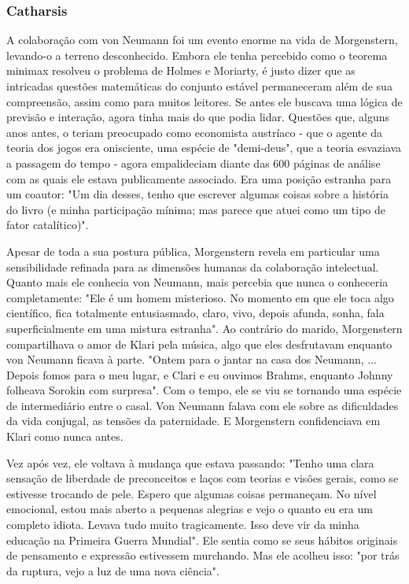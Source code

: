 \documentclass[12pt]{article}
\begin{document}
\subsubsection{\textbf{Catharsis}}
A colaboração com von Neumann foi um evento enorme na vida de Morgenstern, levando-o a terreno desconhecido. Embora ele tenha percebido como o teorema minimax resolveu o problema de Holmes e Moriarty, é justo dizer que as intricadas questões matemáticas do conjunto estável permaneceram além de sua compreensão, assim como para muitos leitores. Se antes ele buscava uma lógica de previsão e interação, agora tinha mais do que podia lidar. Questões que, alguns anos antes, o teriam preocupado como economista austríaco - que o agente da teoria dos jogos era onisciente, uma espécie de "demi-deus", que a teoria esvaziava a passagem do tempo - agora empalideciam diante das 600 páginas de análise com as quais ele estava publicamente associado. Era uma posição estranha para um coautor: "Um dia desses, tenho que escrever algumas coisas sobre a história do livro (e minha participação mínima; mas parece que atuei como um tipo de fator catalítico)".

Apesar de toda a sua postura pública, Morgenstern revela em particular uma sensibilidade refinada para as dimensões humanas da colaboração intelectual. Quanto mais ele conhecia von Neumann, mais percebia que nunca o conheceria completamente: "Ele é um homem misterioso. No momento em que ele toca algo científico, fica totalmente entusiasmado, claro, vivo, depois afunda, sonha, fala superficialmente em uma mistura estranha". Ao contrário do marido, Morgenstern compartilhava o amor de Klari pela música, algo que eles desfrutavam enquanto von Neumann ficava à parte. "Ontem para o jantar na casa dos Neumann, ... Depois fomos para o meu lugar, e Clari e eu ouvimos Brahms, enquanto Johnny folheava Sorokin com surpresa". Com o tempo, ele se viu se tornando uma espécie de intermediário entre o casal. Von Neumann falava com ele sobre as dificuldades da vida conjugal, as tensões da paternidade. E Morgenstern confidenciava em Klari como nunca antes.

Vez após vez, ele voltava à mudança que estava passando: "Tenho uma clara sensação de liberdade de preconceitos e laços com teorias e visões gerais, como se estivesse trocando de pele. Espero que algumas coisas permaneçam. No nível emocional, estou mais aberto a pequenas alegrias e vejo o quanto eu era um completo idiota. Levava tudo muito tragicamente. Isso deve vir da minha educação na Primeira Guerra Mundial". Ele sentia como se seus hábitos originais de pensamento e expressão estivessem murchando. Mas ele acolheu isso: "por trás da ruptura, vejo a luz de uma nova ciência".
\end{document}
